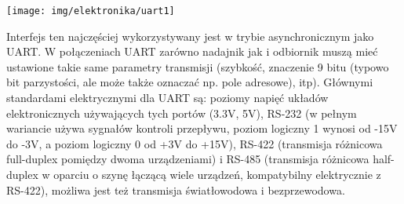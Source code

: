     \begin{center} \texttt{[image: img/elektronika/uart1]} \end{center}
    Interfejs ten najczęściej wykorzystywany jest w trybie asynchronicznym jako UART. W połączeniach UART zarówno nadajnik jak i odbiornik muszą mieć ustawione takie same parametry transmisji (szybkość, znaczenie 9 bitu (typowo bit parzystości, ale może także oznaczać np. pole adresowe), itp).
    Głównymi standardami elektrycznymi dla UART są: poziomy napięć układów elektronicznych używających tych portów (3.3V, 5V), RS-232 (w pełnym wariancie używa sygnałów kontroli przepływu, poziom logiczny 1 wynosi od -15V do -3V, a poziom logiczny 0 od +3V do +15V), RS-422 (transmisja różnicowa full-duplex pomiędzy dwoma urządzeniami) i RS-485 (transmisja różnicowa half-duplex w oparciu o szynę łączącą wiele urządzeń, kompatybilny elektrycznie z RS-422), możliwa jest też transmisja światłowodowa i bezprzewodowa.

    \begin{center}  \end{center}
    \begin{center}  \end{center}

